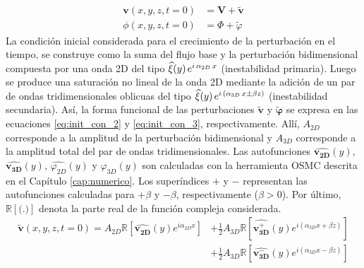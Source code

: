 \begin{equation}
\begin{aligned}
\mathbf{v}(x,y,z,t=0) &= \mathbf{V} + \widetilde{\mathbf{v}} \\
\phi(x,y,z,t=0) &= \Phi +  \widetilde{\varphi} 
\end{aligned}
\label{eq:init_con_1}
\end{equation}
La condición inicial considerada para el crecimiento de la perturbación en el tiempo, se \linebreak construye como la suma del flujo base y la perturbación bidimensional compuesta por una onda 2D del tipo $\widehat{\xi}(y) \hspace{0.5mm} e^{i \hspace{0.5mm} \alpha_{2D} \hspace{0.5mm} x }$ (inestabilidad primaria). Luego se produce una saturación no lineal de la onda 2D mediante la adición de un par de ondas tridimensionales oblicuas del tipo $\widehat{\xi}(y) \hspace{0.5mm} e^{i \hspace{0.5mm}( \alpha_{3D} \hspace{0.5mm} x \pm \beta z ) }$ (inestabilidad secundaria). Así, la forma funcional de las perturbaciones $\widetilde{\mathbf{v}}$ y $\widetilde{\mathbf{\varphi}}$ se expresa en las ecuaciones \ref{eq:init_con_2} y \ref{eq:init_con_3}, respectivamente. Allí, $A_{2D}$ corresponde a la \linebreak amplitud de la perturbación bidimensional y $A_{3D}$ corresponde a la amplitud total del par de ondas tridimensionales. Las autofunciones $\widehat{\mathbf{v^{}_{2D}}}(y)$, $\widehat{\mathbf{v^{}_{3D}}}(y)$, $\widehat{\varphi^{}_{2D}}(y)$ y $\widehat{\varphi^{}_{3D}}(y)$ son calculadas con la herramienta OSMC descrita en el Capítulo \ref{cap:numerico}. Los superíndices $+$ y $-$ representan las autofunciones calculadas para $+ \beta$ y $- \beta$, respectivamente ($\beta>0$). 
Por último, $\mathbb{R}[\text{(.)}]$ denota la parte real de la función compleja considerada.  
\begin{equation}
\begin{aligned}
\widetilde{\mathbf{v}}(x,y,z,t=0) = A_{2D} \mathbb{R} \left[ \widehat{\mathbf{v^{}_{2D}}}(y) e^{\mathit{i} \alpha_{2D} x} \right] &+ \frac{1}{2} A_{3D} \mathbb{R} \left[ \widehat{\mathbf{v^{+}_{3D}}}(y) e^{\mathit{i} ( \alpha_{3D} x + \beta z)} \right] \\
 &+ \frac{1}{2} A_{3D} \mathbb{R} \left[ \widehat{\mathbf{v^{-}_{3D}}}(y) e^{\mathit{i} ( \alpha_{3D} x - \beta z)} \right]
\end{aligned}
\label{eq:init_con_2}
\end{equation}

